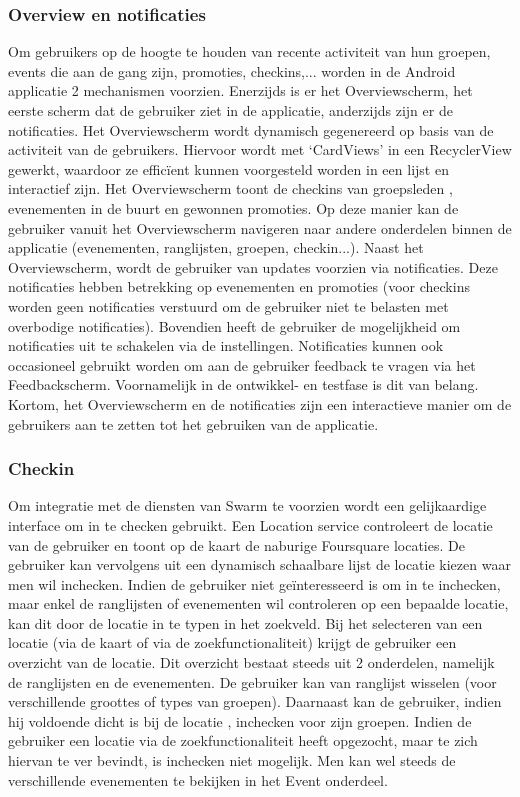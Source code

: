 \subsubsection{Overview en notificaties} %
Om gebruikers op de hoogte te houden van recente activiteit van hun groepen, events die aan de gang zijn, promoties, checkins,... worden in de Android applicatie 2 mechanismen voorzien. 
Enerzijds is er het Overviewscherm, het eerste scherm dat de gebruiker ziet in de applicatie, anderzijds zijn er de notificaties.
Het Overviewscherm wordt dynamisch gegenereerd op basis van de activiteit van de gebruikers. Hiervoor wordt met `CardViews' in een RecyclerView gewerkt, waardoor ze efficïent kunnen voorgesteld worden in een lijst en interactief zijn. Het Overviewscherm toont de checkins van groepsleden , evenementen in de buurt en gewonnen promoties. Op deze manier kan de gebruiker vanuit het Overviewscherm navigeren naar andere onderdelen binnen de applicatie (evenementen, ranglijsten, groepen, checkin...).
Naast het Overviewscherm, wordt de gebruiker van updates voorzien via notificaties. Deze notificaties hebben betrekking op evenementen en promoties (voor checkins worden geen notificaties verstuurd om de gebruiker niet te belasten met overbodige notificaties). Bovendien heeft de gebruiker de mogelijkheid om notificaties uit te schakelen via de instellingen. Notificaties kunnen ook occasioneel gebruikt worden om aan de gebruiker feedback te vragen via het Feedbackscherm. Voornamelijk in de ontwikkel- en testfase is dit van belang.
Kortom, het Overviewscherm en de notificaties zijn een interactieve manier om de gebruikers aan te zetten tot het gebruiken van de applicatie.

\subsubsection{Checkin}%
Om integratie met de diensten van Swarm te voorzien wordt een gelijkaardige interface om in te checken gebruikt. Een Location service controleert de locatie van de gebruiker en toont op de kaart de naburige Foursquare locaties. De gebruiker kan vervolgens uit een dynamisch schaalbare lijst de locatie kiezen waar men wil inchecken. Indien de gebruiker niet geïnteresseerd is om in te inchecken, maar enkel de ranglijsten of evenementen wil controleren op een bepaalde locatie, kan dit door de locatie in te typen in het zoekveld. Bij het selecteren van een locatie (via de kaart of via de zoekfunctionaliteit) krijgt de gebruiker een overzicht van de locatie. Dit overzicht bestaat steeds uit 2 onderdelen, namelijk de ranglijsten en de evenementen. De gebruiker kan van ranglijst wisselen (voor verschillende groottes of types van groepen). Daarnaast kan de gebruiker, indien hij voldoende dicht is bij de locatie , inchecken voor zijn groepen. Indien de gebruiker een locatie via de zoekfunctionaliteit heeft opgezocht, maar te zich hiervan te ver bevindt, is inchecken niet mogelijk. Men kan wel steeds  de verschillende evenementen te bekijken in het Event onderdeel.
